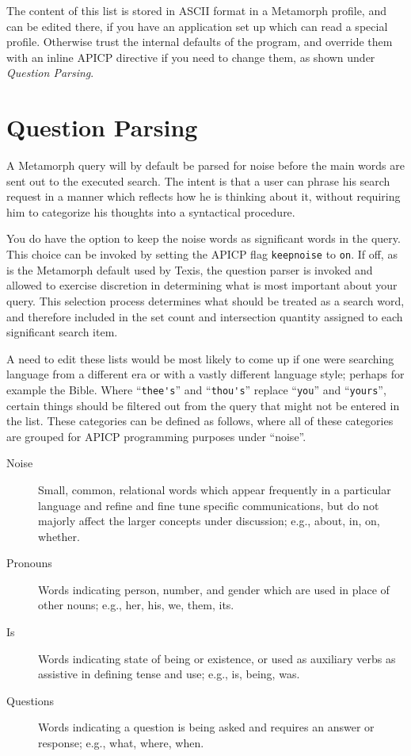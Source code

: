 The content of this list is stored in ASCII format in a Metamorph
profile, and can be edited there, if you have an application set up
which can read a special profile.  Otherwise trust the internal
defaults of the program, and override them with an inline APICP
directive if you need to change them, as shown under {\em Question
Parsing}.

\section{Question Parsing}

A Metamorph query will by default be parsed for noise before the main
words are sent out to the executed search.  The intent is that a user
can phrase his search request in a manner which reflects how he is
thinking about it, without requiring him to categorize his thoughts
into a syntactical procedure.

You do have the option to keep the noise words as significant words in
the query.  This choice can be invoked by setting the APICP flag
\verb`keepnoise` to \verb`on`.  If off, as is the Metamorph
default used by Texis, the question parser is invoked and allowed to
exercise discretion in determining what is most important about your
query.  This selection process determines what should be treated as a
search word, and therefore included in the set count and intersection
quantity assigned to each significant search item.

A need to edit these lists would be most likely to come up if one were
searching language from a different era or with a vastly different
language style; perhaps for example the Bible.  Where
``\verb`thee's`'' and ``\verb`thou's`'' replace ``\verb`you`'' and
``\verb`yours`'', certain things should be filtered out from the query
that might not be entered in the list.  These categories can be
defined as follows, where all of these categories are grouped for
APICP programming purposes under ``noise''.

\begin{description}
\item[Noise] Small, common, relational words which appear frequently
in a particular language and refine and fine tune specific
communications, but do not majorly affect the larger concepts under
discussion; e.g., about, in, on, whether.

\item[Pronouns] Words indicating person, number, and gender which are
used in place of other nouns; e.g., her, his, we, them, its.

\item[Is] Words indicating state of being or existence, or used as
auxiliary verbs as assistive in defining tense and use; e.g., is,
being, was.

\item[Questions] Words indicating a question is being asked and
requires an answer or response; e.g., what, where, when.
\end{description}

